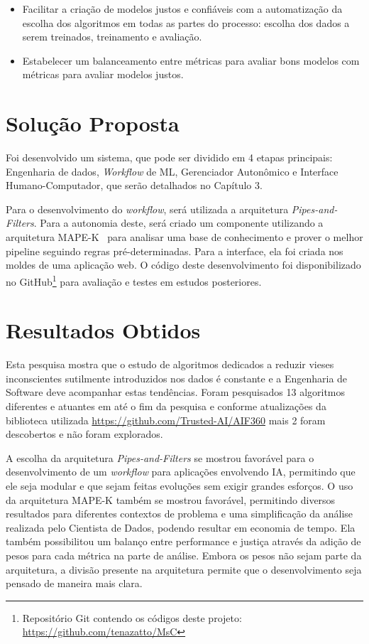 \documentclass[portugues]{ic-tese}
\begin{document}
\begin{itemize}
\item Facilitar a criação de modelos justos e confiáveis com a automatização da escolha dos algoritmos em todas as partes do processo: escolha dos dados a serem treinados, treinamento e avaliação.
\item Estabelecer um balanceamento entre métricas para avaliar bons modelos com métricas para avaliar modelos justos.
\end{itemize}

\section{Solução Proposta}

Foi desenvolvido um sistema, que pode ser dividido em 4 etapas principais: Engenharia de dados, \textit{Workflow} de ML, Gerenciador Autonômico e Interface Humano-Computador, que serão detalhados no Capítulo 3.

Para o desenvolvimento do \textit{workflow}, será utilizada a arquitetura \textit{Pipes-and-Filters}. Para a autonomia deste, será criado um componente utilizando a arquitetura MAPE-K~\citep{IBM_2005} para analisar uma base de conhecimento e prover o melhor pipeline seguindo regras pré-determinadas. Para a interface, ela foi criada nos moldes de uma aplicação web. O código deste desenvolvimento foi disponibilizado no GitHub\footnote{Repositório Git contendo os códigos deste projeto: \url{https://github.com/tenazatto/MsC}} para avaliação e testes em estudos posteriores.

\section{Resultados Obtidos}

Esta pesquisa mostra que o estudo de algoritmos dedicados a reduzir vieses inconscientes sutilmente introduzidos nos dados é constante e a Engenharia de Software deve acompanhar estas tendências. Foram pesquisados 13 algoritmos diferentes e atuantes em até o fim da pesquisa e conforme atualizações da biblioteca utilizada \url{https://github.com/Trusted-AI/AIF360} mais 2 foram descobertos e não foram explorados.

A escolha da arquitetura \textit{Pipes-and-Filters} se mostrou favorável para o desenvolvimento de um \textit{workflow} para aplicações envolvendo IA, permitindo que ele seja modular e que sejam feitas evoluções sem exigir grandes esforços. O uso da arquitetura MAPE-K também se mostrou favorável, permitindo diversos resultados para diferentes contextos de problema e uma simplificação da análise realizada pelo Cientista de Dados, podendo resultar em economia de tempo. Ela também possibilitou um balanço entre performance e justiça através da adição de pesos para cada métrica na parte de análise. Embora os pesos não sejam parte da arquitetura, a divisão presente na arquitetura permite que o desenvolvimento seja pensado de maneira mais clara.
\end{document}
